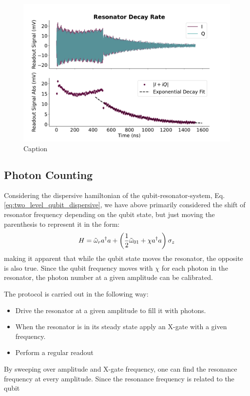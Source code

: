 \begin{figure}
    \centering
    \includegraphics{Calibrations/Figures/Resonator Decay Rate.pdf}
    \caption{Caption}
    \label{fig:enter-label}
\end{figure}

\subsection{Photon Counting}
Considering the dispersive hamiltonian of the qubit-resonator-system, Eq. \ref{eq:two_level_qubit_dispersive}, we have above primarily considered the shift of resonator frequency depending on the qubit state, but just moving the parenthesis to represent it in the form:
\begin{equation}
    H = \Tilde{\omega}_r a^\dagger a  + \left(\frac12 \Tilde{\omega}_{01} + \chi a^\dagger a\right)  \sigma_z
\end{equation}
making it apparent that while the qubit state moves the resonator, the opposite is also true. Since the qubit frequency moves with $\chi$ for each photon in the resonator, the photon number at a given amplitude can be calibrated.  

The protocol is carried out in the following way:
\begin{itemize}
    \item Drive the resonator at a given amplitude to fill it with photons.
    \item When the resonator is in its steady state apply an X-gate with a given frequency.
    \item Perform a regular readout
\end{itemize}
By sweeping over amplitude and X-gate frequency, one can find the resonance frequency at every amplitude. Since the resonance frequency is related to the qubit \\

